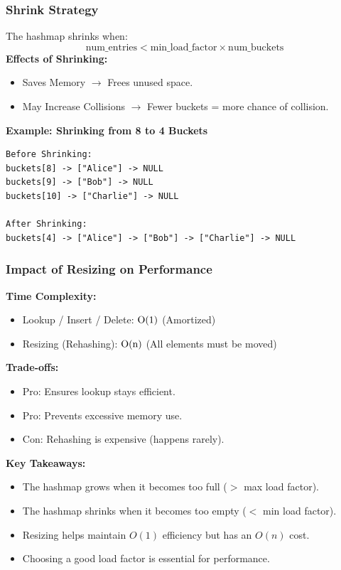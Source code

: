 \documentclass[titlepage]{article}
\begin{document}
\subsubsection{Shrink Strategy}
The hashmap shrinks when:
\[
\text{num\_entries} < \text{min\_load\_factor} \times \text{num\_buckets}
\]
\textbf{Effects of Shrinking:}
\begin{itemize}
    \item Saves Memory $\rightarrow$ Frees unused space.
    \item May Increase Collisions $\rightarrow$ Fewer buckets = more chance of collision.
\end{itemize}

\textbf{Example: Shrinking from 8 to 4 Buckets}
\begin{verbatim}
Before Shrinking:
buckets[8] -> ["Alice"] -> NULL
buckets[9] -> ["Bob"] -> NULL
buckets[10] -> ["Charlie"] -> NULL

After Shrinking:
buckets[4] -> ["Alice"] -> ["Bob"] -> ["Charlie"] -> NULL
\end{verbatim}

\subsubsection{Impact of Resizing on Performance}
\textbf{Time Complexity:}
\begin{itemize}
    \item Lookup / Insert / Delete: \( $O(1)$ \) (Amortized)
    \item Resizing (Rehashing): \( $O(n)$ \) (All elements must be moved)
\end{itemize}

\textbf{Trade-offs:}
\begin{itemize}
    \item Pro: Ensures lookup stays efficient.
    \item Pro: Prevents excessive memory use.
    \item Con: Rehashing is expensive (happens rarely).
\end{itemize}

\textbf{Key Takeaways:}
\begin{itemize}
    \item The hashmap grows when it becomes too full (\( > \) max load factor).
    \item The hashmap shrinks when it becomes too empty (\( < \) min load factor).
    \item Resizing helps maintain \( O(1) \) efficiency but has an \( O(n) \) cost.
    \item Choosing a good load factor is essential for performance.
\end{itemize}
\end{document}
